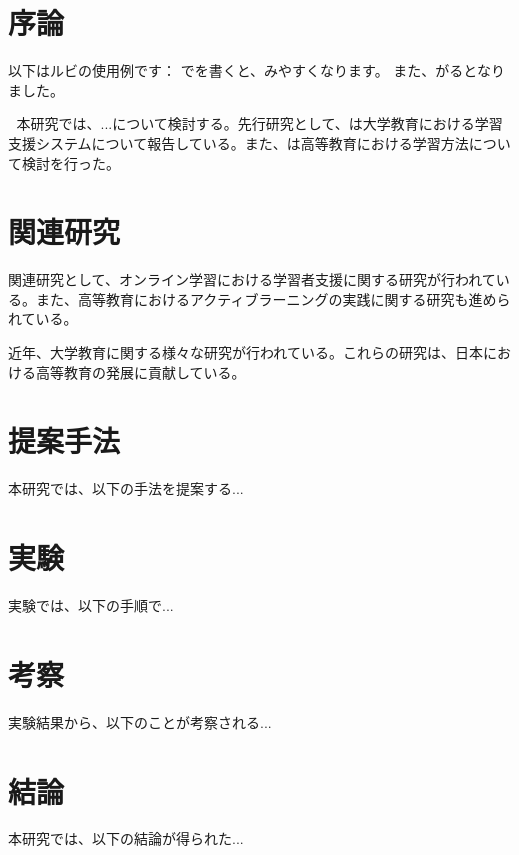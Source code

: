 \section{序論}

以下はルビの使用例です：
でを書くと、みやすくなります。
また、がるとなりました。

🏫
本研究では、...について検討する。先行研究として、は大学教育における学習支援システムについて報告している。また、は高等教育における学習方法について検討を行った。

\section{関連研究}
関連研究として、オンライン学習における学習者支援に関する研究が行われている。また、高等教育におけるアクティブラーニングの実践に関する研究も進められている。

近年、大学教育に関する様々な研究が行われている。これらの研究は、日本における高等教育の発展に貢献している。

\section{提案手法}
本研究では、以下の手法を提案する...

\section{実験}
実験では、以下の手順で...

\section{考察}
実験結果から、以下のことが考察される...

\section{結論}
本研究では、以下の結論が得られた... 